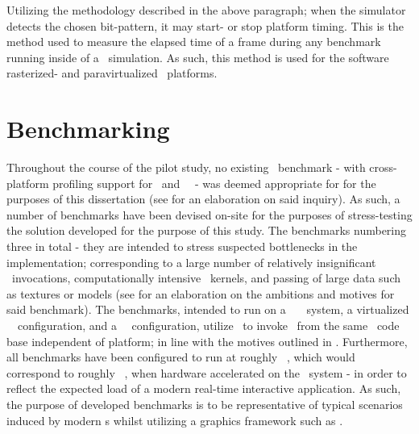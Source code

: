 \noindent
Utilizing the methodology described in the above paragraph; when the simulator detects the chosen bit-pattern, it may start- or stop platform timing.
This is the method used to measure the elapsed time of a frame during any benchmark running inside of a \dvttermsimics\ simulation.
As such, this method is used for the software rasterized- and paravirtualized \dvttermsimics\ platforms. 




\section{Benchmarking}
\label{sec:methodologyexperiment_benchmarking}
Throughout the course of the pilot study, no existing \dvttermopenglestwopointo\ benchmark - with cross-platform profiling support for \dvttermandroid\ and \dvttermxeleven\ \dvttermlinux\ - was deemed appropriate for for the purposes of this dissertation (see  for an elaboration on said inquiry).
As such, a number of benchmarks have been devised on-site for the purposes of stress-testing the solution developed for the purpose of this study.
The benchmarks numbering three in total - they are intended to stress suspected bottlenecks in the implementation; corresponding to a large number of relatively insignificant \dvttermopengl\ invocations, computationally intensive \dvttermgpu\ kernels, and passing of large data such as textures or models (see  for an elaboration on the ambitions and motives for said benchmark).
The benchmarks, intended to run on a \dvttermhost\ \dvttermfedora\ \dvttermlinux\ system, a virtualized \dvttermsimics\ \dvttermfedora\ configuration, and a \dvttermqemu\ \dvttermandroid\ configuration, utilize \dvttermjni\ to invoke \dvttermopengles\ from the same \dvttermc\ code base independent of platform; in line with the motives outlined in .
Furthermore, all benchmarks have been configured to run at roughly ~\milli\second , which would correspond to roughly ~\dvttermfps , when hardware accelerated on the \dvttermhost\ system - in order to reflect the expected load of a modern real-time interactive application.
As such, the purpose of developed benchmarks is to be representative of typical scenarios induced by modern \dvttermgui s whilst utilizing a graphics framework such as \dvttermopengl .

